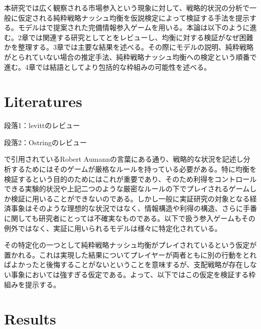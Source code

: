 \documentclass{jsarticle}
\begin{document}
本研究では広く観察される市場参入という現象に対して、戦略的状況の分析で一般に仮定される純粋戦略ナッシュ均衡を仮説検定によって検証する手法を提示する。モデルは\cite{2}で提案された完備情報参入ゲームを用いる。本論は以下のように進む。2章では関連する研究として\cite{11}と\cite{13}をレビューし、均衡に対する検証がなぜ困難かを整理する。3章では主要な結果を述べる。その際にモデルの説明、純粋戦略がとられていない場合の推定手法、純粋戦略ナッシュ均衡への検定という順番で進む。4章では結語としてより包括的な枠組みの可能性を述べる。


\section{Literatures}
段落1：levittのレビュー

段落2：Ostringのレビュー

\cite{11}で引用されているRobert Aumannの言葉にある通り、戦略的な状況を記述し分析するためにはそのゲームが厳格なルールを持っている必要がある。特に均衡を検証するという目的のためにはこれが重要であり、そのため利得をコントロールできる実験的状況や上記二つのような厳密なルールの下でプレイされるゲームしか検証に用いることができないのである。しかし一般に実証研究の対象となる経済事象はそのような理想的な状況ではなく、情報構造や利得の構造、さらに手番に関しても研究者にとっては不確実なものである。以下で扱う参入ゲームもその例外ではなく、実証に用いられるモデルは様々に特定化されている。

その特定化の一つとして純粋戦略ナッシュ均衡がプレイされているという仮定が置かれる。これは実現した結果についてプレイヤーが両者ともに別の行動をとればよかったと後悔することがないということを意味するが、支配戦略が存在しない事象においては強すぎる仮定である。よって、以下ではこの仮定を検証する枠組みを提示する。

\section{Results}
\end{document}
